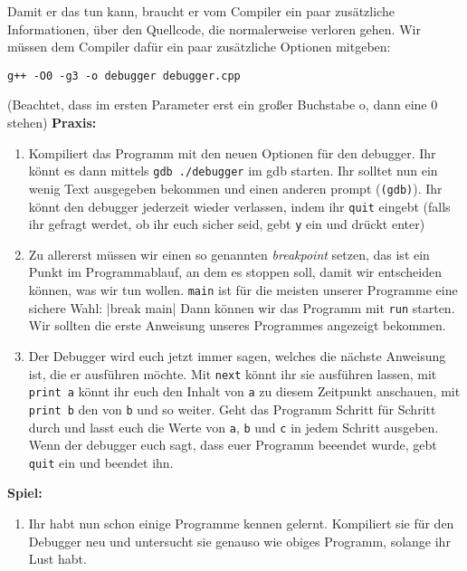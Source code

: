 Damit er das tun kann, braucht er vom Compiler ein paar zusätzliche
Informationen, über den Quellcode, die normalerweise verloren gehen. Wir müssen
dem Compiler dafür ein paar zusätzliche Optionen mitgeben:
\begin{verbatim}
g++ -O0 -g3 -o debugger debugger.cpp
\end{verbatim}
(Beachtet, dass im ersten Parameter erst ein großer Buchstabe o, dann eine 0 stehen)
\textbf{Praxis:}
\begin{enumerate}
    \item Kompiliert das Programm mit den neuen Optionen für den debugger. Ihr
        könnt es dann mittels \verb|gdb ./debugger| im gdb starten. Ihr solltet
        nun ein wenig Text ausgegeben bekommen und einen anderen prompt
        (\texttt{(gdb)}). Ihr könnt den debugger jederzeit wieder verlassen,
        indem ihr \texttt{quit} eingebt (falls ihr gefragt werdet, ob ihr euch
        sicher seid, gebt \texttt{y} ein und drückt enter)
    \item Zu allererst müssen wir einen so genannten \emph{breakpoint} setzen,
        das ist ein Punkt im Programmablauf, an dem es stoppen soll, damit wir
        entscheiden können, was wir tun wollen. \texttt{main} ist für die
        meisten unserer Programme eine sichere Wahl:
        |break main|
        Dann können wir das Programm mit \texttt{run} starten. Wir sollten die
        erste Anweisung unseres Programmes angezeigt bekommen.
    \item Der Debugger wird euch jetzt immer sagen, welches die nächste
        Anweisung ist, die er ausführen möchte. Mit \texttt{next} könnt ihr sie
        ausführen lassen, mit \texttt{print a} könnt ihr euch den Inhalt von
        \texttt{a} zu diesem Zeitpunkt anschauen, mit \texttt{print b} den von
        \texttt{b} und so weiter. Geht das Programm Schritt für Schritt durch
        und lasst euch die Werte von \texttt{a}, \texttt{b} und \texttt{c} in
        jedem Schritt ausgeben. Wenn der debugger euch sagt, dass euer Programm
        beeendet wurde, gebt \texttt{quit} ein und beendet ihn.
\end{enumerate}

\textbf{Spiel:}
\begin{enumerate}
    \item Ihr habt nun schon einige Programme kennen gelernt. Kompiliert sie
        für den Debugger neu und untersucht sie genauso wie obiges Programm,
        solange ihr Lust habt.
\end{enumerate}
